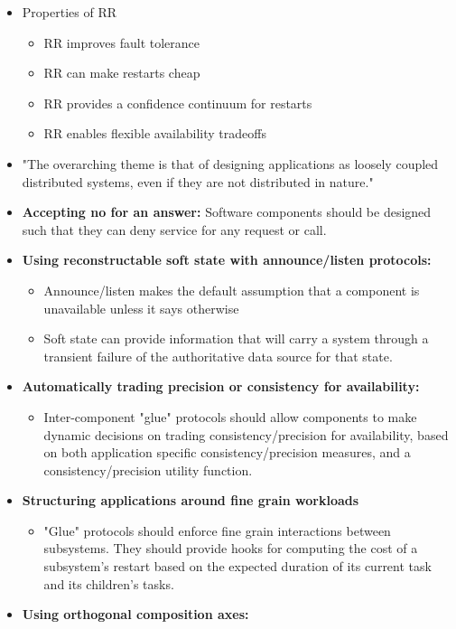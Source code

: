 \begin{itemize}
	\item Properties of RR
	\begin{itemize}
		\item RR improves fault tolerance
		\item RR can make restarts cheap
		\item RR provides a confidence continuum for restarts
		\item RR enables flexible availability tradeoffs
	\end{itemize}
	\item "The overarching theme is that of designing applications as loosely coupled distributed systems, even if they are not distributed in nature."
	\item \textbf{Accepting no for an answer:} Software components should be designed such that they can deny service for any request or call.
	\item \textbf{Using reconstructable soft state with announce/listen protocols: } 
	\begin{itemize}
  		\item Announce/listen makes the default assumption that a component is unavailable unless it says otherwise
  		\item Soft state can provide information that will carry a system through a transient failure of the authoritative data source for that state.
	\end{itemize}
	\item \textbf{Automatically trading precision or consistency for availability: }
	\begin{itemize}
		\item Inter-component "glue" protocols should allow components to make dynamic decisions on trading consistency/precision for availability, based on both application specific consistency/precision measures, and a consistency/precision utility function.
	\end{itemize}
	\item \textbf{Structuring applications around fine grain workloads}
	\begin{itemize}
		\item "Glue" protocols should enforce fine grain interactions between subsystems. They should provide hooks for computing the cost of a subsystem's restart based on the expected duration of its current task and its children's tasks.
	\end{itemize}
	\item \textbf{Using orthogonal composition axes: }
	\begin{itemize}

\end{itemize}
\end{itemize}
